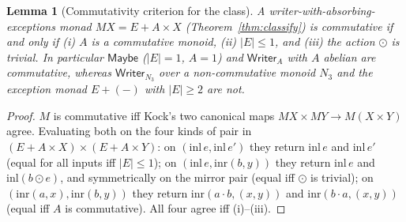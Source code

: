 \documentclass[11pt]{amsart}
\theoremstyle{plain}
\newtheorem{lemma}[theorem]{Lemma}
\theoremstyle{definition}
\theoremstyle{remark}
\newcommand{\Maybe}{\mathsf{Maybe}}
\newcommand{\Writer}{\mathsf{Writer}}
\begin{document}
\begin{lemma}[Commutativity criterion for the class]\label{lem:commcrit}
A writer-with-absorbing-exceptions monad $MX=E+A\times X$ (Theorem~\ref{thm:classify}) is
commutative if and only if \textup{(i)} $A$ is a commutative monoid, \textup{(ii)} $|E|\le1$,
and \textup{(iii)} the action $\odot$ is trivial. In particular $\Maybe$ ($|E|=1$, $A=1$) and
$\Writer_A$ with $A$ abelian are commutative, whereas $\Writer_{N_3}$ over a non-commutative
monoid $N_3$ and the exception monad $E+(-)$ with $|E|\ge2$ are not.
\end{lemma}
\begin{proof}
$M$ is commutative iff Kock's two canonical maps $MX\times MY\to M(X\times Y)$ agree.
Evaluating both on the four kinds of pair in $(E+A\times X)\times(E+A\times Y)$: on
$(\mathrm{inl}\,e,\mathrm{inl}\,e')$ they return $\mathrm{inl}\,e$ and $\mathrm{inl}\,e'$
(equal for all inputs iff $|E|\le1$); on $(\mathrm{inl}\,e,\mathrm{inr}(b,y))$ they return
$\mathrm{inl}\,e$ and $\mathrm{inl}(b\odot e)$, and symmetrically on the mirror pair (equal iff
$\odot$ is trivial); on $(\mathrm{inr}(a,x),\mathrm{inr}(b,y))$ they return
$\mathrm{inr}(a\cdot b,(x,y))$ and $\mathrm{inr}(b\cdot a,(x,y))$ (equal iff $A$ is
commutative). All four agree iff (i)--(iii).
\end{proof}
\end{document}
